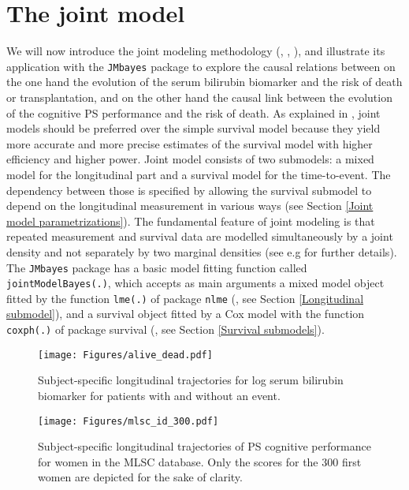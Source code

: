 \documentclass[12pt]{article}
\begin{document}
\section{The joint model}
\label{the model}

We will now introduce the joint modeling methodology (\cite{Henderson2000},  \cite{rizopoulos_book}, \cite{Wulfsohn1997}), and illustrate its application with the \texttt{JMbayes} package to explore the causal relations between on the one hand the evolution of the serum bilirubin biomarker and the risk of death or transplantation, and on the other hand the causal link between the evolution of the cognitive PS performance and the risk of death. As explained in \cite{gould_joint_2015}, joint models should be preferred over the simple survival model because they yield more accurate and more precise estimates of the survival model with higher efficiency and higher power.
Joint model consists of two submodels: a mixed model for the longitudinal part and a survival model for the time-to-event. The dependency between those is specified by allowing the survival submodel to depend on the longitudinal measurement in various ways (see Section \ref{Joint model parametrizations}). The fundamental feature of joint modeling is that repeated measurement and survival data are modelled simultaneously by a joint density and not separately by two marginal densities (see e.g \cite{Rizopoulos_JASA} for further details).  
The \texttt{JMbayes} package has a basic model fitting function called \texttt{jointModelBayes(.)}, which accepts as main arguments a mixed model object fitted by the function \texttt{lme(.)} of package \texttt{nlme} (\cite{nlme}, see Section \ref{Longitudinal submodel}), and a survival object fitted by a Cox model with the function
\texttt{coxph(.)} of package survival (\cite{survival-package}, see Section \ref{Survival submodels}).
 
\begin{figure}[!tb]
\centering
\texttt{[image: Figures/alive\_dead.pdf]}
\caption{Subject-specific longitudinal trajectories for log serum bilirubin biomarker for patients with and without an event.}
\label{alive_dead}
\end{figure}

\begin{figure}[!tb]
\centering
\texttt{[image: Figures/mlsc\_id\_300.pdf]}
\caption{Subject-specific longitudinal trajectories of PS cognitive performance for women in the MLSC database. Only the scores for the 300 first women are depicted for the sake of clarity.}
\label{MLSCalive_dead}
\end{figure}
\end{document}
